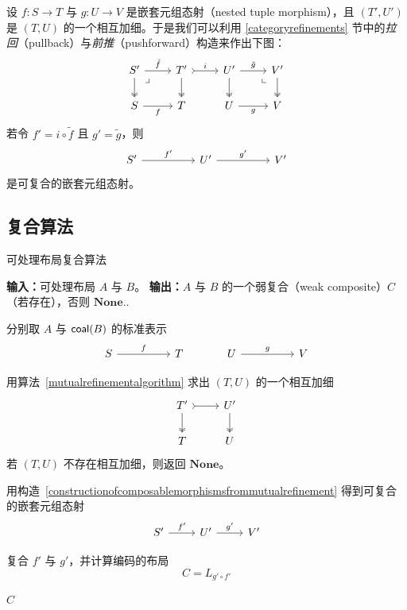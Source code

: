 \begin{construction}\label{constructionofcomposablemorphismsfrommutualrefinement}
    设 $f:S \to T$ 与 $g:U \to V$ 是嵌套元组态射（nested tuple morphism），且 $(T',U')$ 是 $(T,U)$ 的一个相互加细。于是我们可以利用 \ref{categoryrefinements} 节中的{\it 拉回}（pullback）与{\it 前推}（pushforward）构造来作出下图：
    \[ \begin{tikzcd}
    S' \ar[r,"\tilde{f}"] \ar[d,two heads] \arrow[dr, phantom, "\lrcorner", very near start] & T' \ar[d,two heads] \ar[r,"i",rightarrowtail] & U' \ar[r,"\tilde{g}"] \ar[d,two heads] & V' \ar[d,two heads]\arrow[dl, phantom, "\llcorner", very near start] \\
    S \ar[r,swap,"f"] & T & U \ar[r,swap,"g"] & V
    \end{tikzcd} \]
    若令 $f' = i \circ \tilde{f}$ 且 $g' = \tilde{g}$，则
    \[ \begin{tikzcd}
    S' \ar[rr,"f'"] & & U' \ar[rr,"g'"] & & V'
    \end{tikzcd} \]
    是可复合的嵌套元组态射。
\end{construction}


\subsection{复合算法}

\begin{BreakableAlgorithm}{可处理布局复合算法}
\label{tractablelayoutcompositionalgorithm}
\begin{algorithmic}[1]
\State \textbf{输入：}可处理布局 $A$ 与 $B$。
\State \textbf{输出：}$A$ 与 $B$ 的一个弱复合（weak composite）$C$（若存在），否则 $\mathbf{None}$..
\algsep

\State 分别取 $A$ 与 $\mathsf{coal}(B)$ 的标准表示
\[
\begin{tikzcd}
S \ar[rr,"f"] & & T
\qquad\qquad
U \ar[rr,"g"] & & V
\end{tikzcd}
\]

\State 用算法~\ref{mutualrefinementalgorithm} 求出 $(T,U)$ 的一个相互加细
\[
\begin{tikzcd}
T' \ar[r,rightarrowtail] \ar[d,two heads] & U' \ar[d,two heads] \\
T & U
\end{tikzcd}
\]
若 $(T,U)$ 不存在相互加细，则返回 $\mathbf{None}$。

\State 用构造~\ref{constructionofcomposablemorphismsfrommutualrefinement} 得到可复合的嵌套元组态射
\[
\begin{tikzcd}
S' \ar[r,"f'"] & U' \ar[r,"g'"] & V'
\end{tikzcd}
\]

\State 复合 $f'$ 与 $g'$，并计算编码的布局
\[
C = L_{g' \circ f'}
\]

\State \Return $C$
\end{algorithmic}
\end{BreakableAlgorithm}



